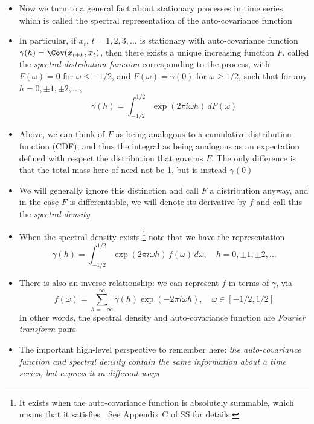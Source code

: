\documentclass{article}
\begin{document}
\begin{itemize}
\item Now we turn to a general fact about stationary processes in time series,
  which is called the spectral representation of the auto-covariance function 

\item In particular, if $x_t$, $t = 1,2,3,\dots$ is stationary with
  auto-covariance function $\gamma(h) = \Cov(x_{t+h}, x_t)$, then there exists a 
  unique increasing function $F$, called the \emph{spectral distribution
    function} corresponding to the process, with $F(\omega) = 0$ for $\omega
  \leq -1/2$, and $F(\omega) = \gamma(0)$ for $\omega \geq 1/2$, such that for
  any $h = 0, \pm 1, \pm 2, \dots$,  
  \[
  \gamma(h) = \int_{-1/2}^{1/2} \exp(2\pi i \omega h) \, dF(\omega) 
  \]

\item Above, we can think of $F$ as being analogous to a cumulative distribution
  function (CDF), and thus the integral as being analogous as an expectation
  defined with respect the distribution that governs $F$. The only difference is
  that the total mass here of need not be 1, but is instead $\gamma(0)$ 

\item We will generally ignore this distinction and call $F$ a distribution
  anyway, and in the case $F$ is differentiable, we will denote its derivative
  by $f$ and call this the \emph{spectral density}

\item When the spectral density exists,\footnote{It exists when the
    auto-covariance function is absolutely summable, which means that it
    satisfies . See
    Appendix C of SS for details.} 
  note that we have the representation 
  \[
  \gamma(h) = \int_{-1/2}^{1/2} \exp(2\pi i \omega h) \, f(\omega) \, d\omega,
  \quad h = 0, \pm 1, \pm 2, \dots
  \]

\item There is also an inverse relationship: we can represent $f$ in terms of
  $\gamma$, via 
  \begin{equation}
  \label{eq:spectral_density}
  f(\omega) = \sum_{h=-\infty}^\infty \gamma(h) \exp(-2\pi i \omega h), \quad
  \omega \in [-1/2, 1/2] 
  \end{equation}
  In other words, the spectral density and auto-covariance function are
  \emph{Fourier transform} pairs

\item The important high-level perspective to remember here: \emph{the
    auto-covariance function and spectral density contain the same information 
    about a time series, but express it in different ways}


\end{itemize}
\end{document}
